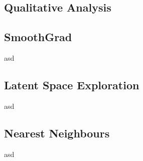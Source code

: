 \documentclass[12pt]{article}
\begin{document}
\begin{multicols*}{2}
        \section{Qualitative Analysis}
        \label{sec:qualitative}
        \subsection{SmoothGrad}
        \label{subsec:smoothgrad}
        asd
        \subsection{Latent Space Exploration}
        \label{subsec:latentSpaceExploration}
        asd
        \subsection{Nearest Neighbours}
        \label{subsec:nearestneighbours}
        asd
    \end{multicols*}
    \newpage
\end{document}
